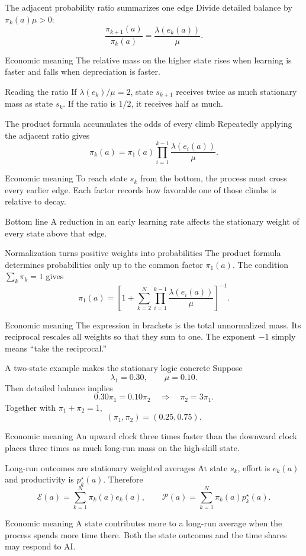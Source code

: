 \documentclass[aspectratio=169,11pt]{beamer}
\newcommand{\calP}{\mathcal{P}}
\newcommand{\calE}{\mathcal{E}}
\newcommand{\econmeaning}[1]{%
  \begin{block}{Economic meaning}
  #1
  \end{block}}
\newcommand{\bottomline}[1]{%
  \begin{alertblock}{Bottom line}
  #1
  \end{alertblock}}
\begin{document}
\begin{frame}{The adjacent probability ratio summarizes one edge}
Divide detailed balance by $\pi_k(a)\mu>0$:
\[
\boxed{\frac{\pi_{k+1}(a)}{\pi_k(a)}
=\frac{\lambda(e_k(a))}{\mu}.}
\]
\econmeaning{The relative mass on the higher state rises when learning is faster and falls when depreciation is faster.}
\begin{exampleblock}{Reading the ratio}
If $\lambda(e_k)/\mu=2$, state $s_{k+1}$ receives twice as much stationary mass as state $s_k$. If the ratio is $1/2$, it receives half as much.
\end{exampleblock}
\end{frame}

\begin{frame}{The product formula accumulates the odds of every climb}
Repeatedly applying the adjacent ratio gives
\[
\boxed{\pi_k(a)=\pi_1(a)
\prod_{i=1}^{k-1}\frac{\lambda(e_i(a))}{\mu}.}
\]
\econmeaning{To reach state $s_k$ from the bottom, the process must cross every earlier edge. Each factor records how favorable one of those climbs is relative to decay.}
\bottomline{A reduction in an early learning rate affects the stationary weight of every state above that edge.}
\end{frame}

\begin{frame}{Normalization turns positive weights into probabilities}
The product formula determines probabilities only up to the common factor $\pi_1(a)$. The condition $\sum_k\pi_k=1$ gives
\[
\boxed{\pi_1(a)=
\left[
1+\sum_{k=2}^{N}\prod_{i=1}^{k-1}
\frac{\lambda(e_i(a))}{\mu}
\right]^{-1}.}
\]
\econmeaning{The expression in brackets is the total unnormalized mass. Its reciprocal rescales all weights so that they sum to one. The exponent $-1$ simply means ``take the reciprocal.''}
\end{frame}

\begin{frame}{A two-state example makes the stationary logic concrete}
Suppose
\[
\lambda_1=0.30,
\qquad
\mu=0.10.
\]
Then detailed balance implies
\[
0.30\pi_1=0.10\pi_2
\quad\Longrightarrow\quad
\pi_2=3\pi_1.
\]
Together with $\pi_1+\pi_2=1$,
\[
\boxed{(\pi_1,\pi_2)=(0.25,0.75).}
\]
\econmeaning{An upward clock three times faster than the downward clock places three times as much long-run mass on the high-skill state.}
\end{frame}

\begin{frame}{Long-run outcomes are stationary weighted averages}
At state $s_k$, effort is $e_k(a)$ and productivity is $p_k^\star(a)$. Therefore
\[
\boxed{\calE(a)=\sum_{k=1}^{N}\pi_k(a)e_k(a),
\qquad
\calP(a)=\sum_{k=1}^{N}\pi_k(a)p_k^\star(a).}
\]
\econmeaning{A state contributes more to a long-run average when the process spends more time there. Both the state outcomes and the time shares may respond to AI.}
\end{frame}
\end{document}
